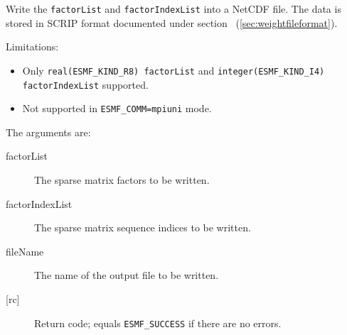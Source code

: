      Write the {\tt factorList} and {\tt factorIndexList} into a NetCDF file.
     The data is stored in SCRIP format documented under section 
     ~(\ref{sec:weightfileformat}).
  
     Limitations:
     \begin{itemize}
       \item Only {\tt real(ESMF\_KIND\_R8) factorList} and 
             {\tt integer(ESMF\_KIND\_I4) factorIndexList} supported.
       \item Not supported in {\tt ESMF\_COMM=mpiuni} mode.
     \end{itemize}
  
    The arguments are:
    \begin{description}
     \item[factorList]
      The sparse matrix factors to be written.
     \item[factorIndexList]
      The sparse matrix sequence indices to be written.
     \item[fileName]
      The name of the output file to be written.
     \item[{[rc]}]
      Return code; equals {\tt ESMF\_SUCCESS} if there are no errors.
    \end{description}
  
\setlength{\parskip}{\oldparskip}
\setlength{\parindent}{\oldparindent}
\setlength{\baselineskip}{\oldbaselineskip}
